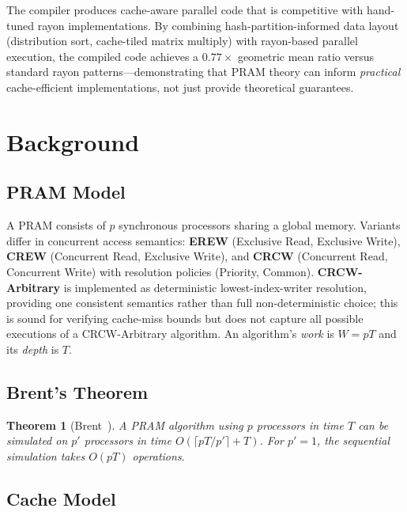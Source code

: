 \documentclass[11pt]{article}
\newtheorem{theorem}{Theorem}
\begin{document}
The compiler produces cache-aware parallel code that is competitive with
hand-tuned rayon implementations.  By combining hash-partition-informed
data layout (distribution sort, cache-tiled matrix multiply) with
rayon-based parallel execution, the compiled code achieves a $0.77\times$
geometric mean ratio versus standard rayon patterns---demonstrating that
PRAM theory can inform \emph{practical} cache-efficient implementations,
not just provide theoretical guarantees.

\section{Background}
\label{sec:background}

\subsection{PRAM Model}

A PRAM consists of $p$ synchronous processors sharing a global memory.
Variants differ in concurrent access semantics:
\textbf{EREW} (Exclusive Read, Exclusive Write),
\textbf{CREW} (Concurrent Read, Exclusive Write), and
\textbf{CRCW} (Concurrent Read, Concurrent Write) with resolution policies
(Priority, Common).  \textbf{CRCW-Arbitrary} is implemented as
deterministic lowest-index-writer resolution, providing one consistent
semantics rather than full non-deterministic choice; this is sound for
verifying cache-miss bounds but does not capture all possible executions
of a CRCW-Arbitrary algorithm.  An algorithm's \emph{work} is $W = pT$
and its \emph{depth} is $T$.

\subsection{Brent's Theorem}

\begin{theorem}[Brent~\cite{brent1974parallel}]
A PRAM algorithm using $p$ processors in time $T$ can be simulated on
$p'$ processors in time $O(\lceil pT/p' \rceil + T)$.  For $p' = 1$,
the sequential simulation takes $O(pT)$ operations.
\end{theorem}

\subsection{Cache Model}
\end{document}
